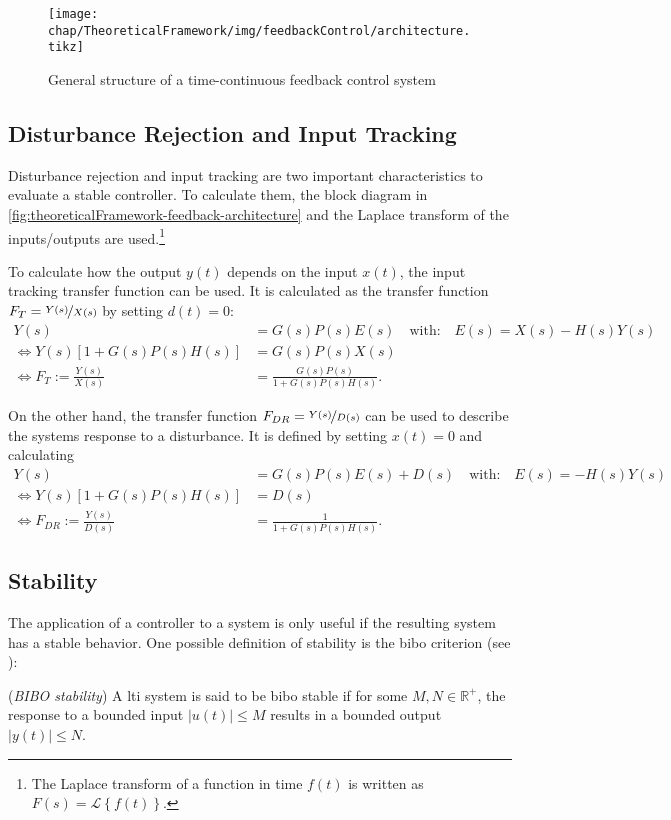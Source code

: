 \begin{figure}[tb]
	\centering
	\texttt{[image: chap/TheoreticalFramework/img/feedbackControl/architecture.tikz]}
	\caption[Control system structure]{General structure of a time-continuous feedback control system}
	\label{fig:theoreticalFramework-feedback-architecture}
\end{figure}

\subsection{Disturbance Rejection and Input Tracking}\label{sec:drandtrack}
Disturbance rejection and input tracking are two important characteristics to evaluate a stable controller. To calculate them, the block diagram in \autoref{fig:theoreticalFramework-feedback-architecture} and the Laplace transform of the inputs/outputs are used.\footnote{The Laplace transform of a function in time $f(t)$ is written as $F(s)=\mathcal{L}\left\{f(t)\right\}$.} 

To calculate how the output $y(t)$ depends on the input $x(t)$, the input tracking transfer function can be used. \cite[p.~88]{Foellinger2016}
It is calculated as the transfer function $F_T=\nicefrac{Y(s)}{X(s)}$ by setting $d(t)=0$:
\begin{align}\label{eq:inputTracking}
Y(s)&=G(s)P(s)E(s)\quad\text{with:}\quad E(s)=X(s)-H(s)Y(s)\\
\Leftrightarrow Y(s)\left[1+G(s)P(s)H(s)\right]&=G(s)P(s)X(s)\\
\Leftrightarrow F_T:=\frac{Y(s)}{X(s)} &= \frac{G(s)P(s)}{1+G(s)P(s)H(s)}.
\end{align}

On the other hand, the transfer function $F_{DR}=\nicefrac{Y(s)}{D(s)}$ can be used to describe the systems response to a disturbance. \cite[p.~88]{Foellinger2016} It is defined by setting $x(t)=0$ and calculating
\begin{align}\label{eq:disturbanceRejection}
Y(s)&=G(s)P(s)E(s)+D(s)\quad\text{with:}\quad E(s)=-H(s)Y(s)\\
\Leftrightarrow Y(s)\left[1+G(s)P(s)H(s)\right]&=D(s)\\
\Leftrightarrow F_{DR}:=\frac{Y(s)}{D(s)}&=\frac{1}{1+G(s)P(s)H(s)}.
\end{align}

\subsection{Stability}
The application of a controller to a system is only useful if the resulting system has a stable behavior.
One possible definition of stability is the \gls{bibo} criterion (see \cite[p.~82]{Foellinger2016}):
\begin{definition}\label{def:bibo}
(\textit{BIBO stability}) A \gls{lti} system is said to be \gls{bibo} stable if for some $M,N \in \mathbb{R}^+$, the response to a bounded input $|u(t)| \le M$ results in a bounded output $|y(t)| \le N$.
\end{definition}


